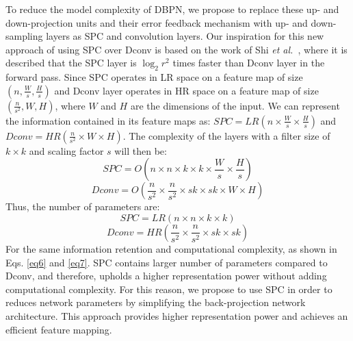 \documentclass[a4paper,11pt]{article}
\begin{document}
To reduce the model complexity of DBPN, we propose to replace these up- and down-projection units and their error feedback mechanism with up- and down-sampling layers as SPC and convolution layers. Our inspiration for this new approach of using SPC over Dconv is based on the work of Shi \textit{et al.}~\cite{ESPCN}, where it is described that the SPC layer is $\log_{2}r^2$ times faster than Dconv layer in the forward pass. Since SPC operates in LR space on a feature map of size $\left(n, \frac{W}{s}, \frac{H}{s}\right)$ and Dconv layer operates in HR space on a feature map of size $\left(\frac{n}{s^2}, W, H\right)$, where $W$ and $H$ are the dimensions of the input. We can represent the information contained in its feature maps as: $SPC = {LR}\left(n \times \frac{W}{s} \times \frac{H}{s}\right)$ and $Dconv = {HR}\left(\frac{n}{s^2} \times W \times H\right)$.
The complexity of the layers with a filter size of $k \times k$ and scaling factor $s$ will then be:
\vspace{-0.5em}
\begin{equation}
SPC = {O}\left(n \times n \times k \times k \times \frac{W}{s} \times \frac{H}{s}\right)
\end{equation}
\begin{equation}
Dconv = {O}\left(\frac{n}{s^2} \times \frac{n}{s^2} \times sk \times sk \times W \times H\right)
\end{equation}
Thus, the number of parameters are:
\begin{equation}
\label{eq6}
SPC = {LR}\left(n \times n \times k \times k\right)
\end{equation}
\begin{equation}
\label{eq7}
Dconv = {HR}\left(\frac{n}{s^2} \times \frac{n}{s^2} \times sk \times sk\right)
\end{equation}
For the same information retention and computational complexity, as shown in Eqs. \eqref{eq6} and \eqref{eq7}. 
SPC contains larger number of parameters compared to Dconv, and therefore, upholds a higher representation power without adding computational complexity. For this reason, we propose to use SPC in order to reduces network parameters by simplifying the back-projection network architecture. This approach provides higher representation power and achieves an efficient feature mapping.
\end{document}
